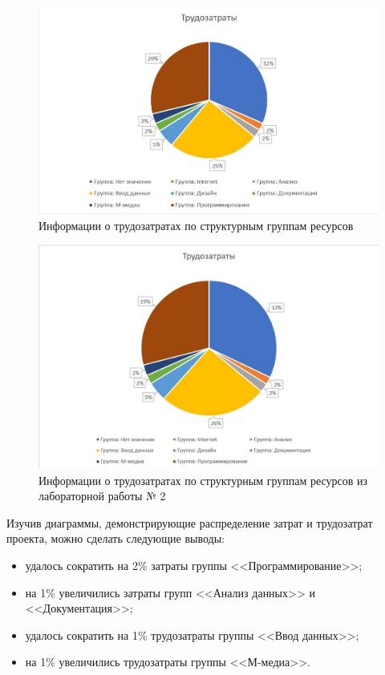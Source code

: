\begin{figure}[H]
	\begin{center}
		\includegraphics[scale=0.4]{inc/img/task3-graph-labor.jpg}
	\end{center}
	\captionsetup{justification=centering}
	\caption{Информации о трудозатратах по структурным группам ресурсов}
	\label{img:task3-graph-labor}
\end{figure}

\begin{figure}[H]
	\begin{center}
		\includegraphics[scale=0.4]{inc/img/task3-labor-costs-graph.jpg}
	\end{center}
	\captionsetup{justification=centering}
	\caption{Информации о трудозатратах по структурным группам ресурсов из лабораторной работы № 2}
	\label{img:task3-labor-costs-graph}
\end{figure}

Изучив диаграммы, демонстрирующие распределение затрат и трудозатрат проекта, можно сделать следующие выводы:
\begin{itemize}
	\item удалось сократить на 2\% затраты группы <<Программирование>>;
	\item на 1\% увеличились затраты групп <<Анализ данных>> и <<Документация>>;
	\item удалось сократить на 1\% трудозатраты группы <<Ввод данных>>;
	\item на 1\% увеличились трудозатраты группы <<М-медиа>>.
\end{itemize}

